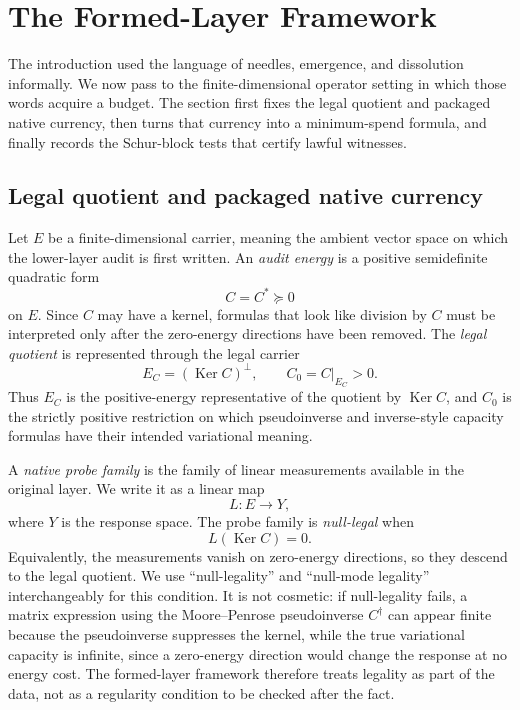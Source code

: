 \documentclass[11pt]{article}
\DeclareMathOperator{\Ker}{Ker}
\theoremstyle{definition}
\begin{document}
 

\section{The Formed-Layer Framework}
\label{sec:framework}

The introduction used the language of needles, emergence, and
dissolution informally.  We now pass to the finite-dimensional
operator setting in which those words acquire a budget.  The section
first fixes the legal quotient and packaged native currency, then
turns that currency into a minimum-spend formula, and finally records
the Schur-block tests that certify lawful witnesses.

\subsection{Legal quotient and packaged native currency}

Let \(E\) be a finite-dimensional carrier, meaning the ambient vector
space on which the lower-layer audit is first written.  An
\emph{audit energy} is a positive semidefinite quadratic form
\[
  C=C^*\succeq 0
\]
on \(E\).  Since \(C\) may have a kernel, formulas that look like
division by \(C\) must be interpreted only after the zero-energy
directions have been removed.  The \emph{legal quotient} is represented
through the legal carrier
\[
  E_C=(\Ker C)^\perp,\qquad C_0=C|_{E_C}>0.
\]
Thus \(E_C\) is the positive-energy representative of the quotient by
\(\Ker C\), and \(C_0\) is the strictly positive restriction on which
pseudoinverse and inverse-style capacity formulas have their intended
variational meaning.

A \emph{native probe family} is the family of linear measurements
available in the original layer.  We write it as a linear map
\[
  L:E\to Y,
\]
where \(Y\) is the response space.  The probe family is
\emph{null-legal} when
\[
  L(\Ker C)=0.
\]
Equivalently, the measurements vanish on zero-energy directions, so
they descend to the legal quotient.  We use ``null-legality'' and
``null-mode legality'' interchangeably for this condition.  It is not
cosmetic: if null-legality fails, a matrix expression using the
Moore--Penrose pseudoinverse \(C^\dagger\)
\citep{Penrose1955GeneralizedInverse,BenIsraelGreville2003GeneralizedInverses}
can appear finite because the pseudoinverse suppresses
the kernel, while the true variational capacity is infinite, since a
zero-energy direction would change the response at no energy cost.  The formed-layer
framework therefore treats legality as part of the data, not as a
regularity condition to be checked after the fact.
\end{document}

